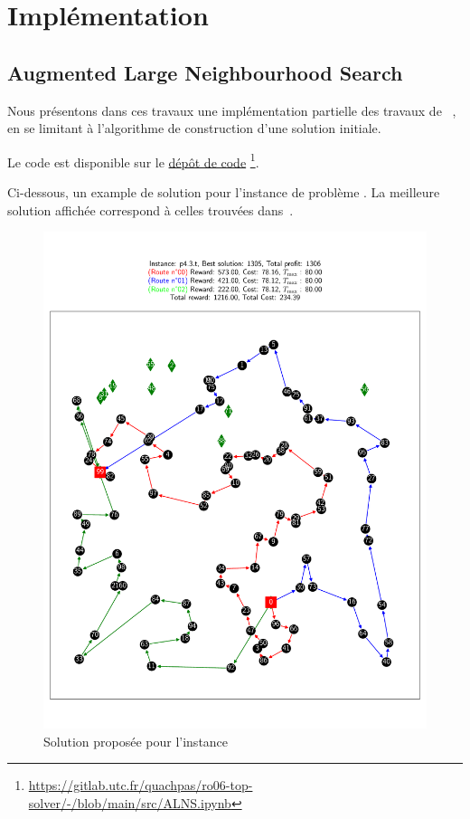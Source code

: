 \documentclass[a4paper]{scrartcl}
\begin{document}
\section{Implémentation}
\label{sec:implementation}

\subsection{Augmented Large Neighbourhood Search}%
\label{ssec:augmented-large-neighbourhood-search}

Nous présentons dans ces travaux une implémentation partielle des travaux de
~\cite{kim.etal_jun2013}, en se limitant à l'algorithme de construction d'une
solution initiale.

Le code est disponible sur le 
\href{https://gitlab.utc.fr/quachpas/ro06-top-solver/-/blob/main/src/ALNS.ipynb}{dépôt de code}
\footnote{
	\href{https://gitlab.utc.fr/quachpas/ro06-top-solver/-/blob/main/src/ALNS.ipynb}
	{https://gitlab.utc.fr/quachpas/ro06-top-solver/-/blob/main/src/ALNS.ipynb}
}.

Ci-dessous, un example de solution pour l'instance de problème
. La meilleure solution affichée correspond à celles trouvées
dans~\cite{kim.etal_jun2013}.

\begin{figure}[htpb]
	\centering
	\includegraphics[width=\textwidth]{alns_p4.3.t.pdf}
	\caption{Solution proposée pour l'instance }
	\label{fig:alns}
\end{figure}


\printnoidxglossary[type=acronym]
\printbibliography
\end{document}
